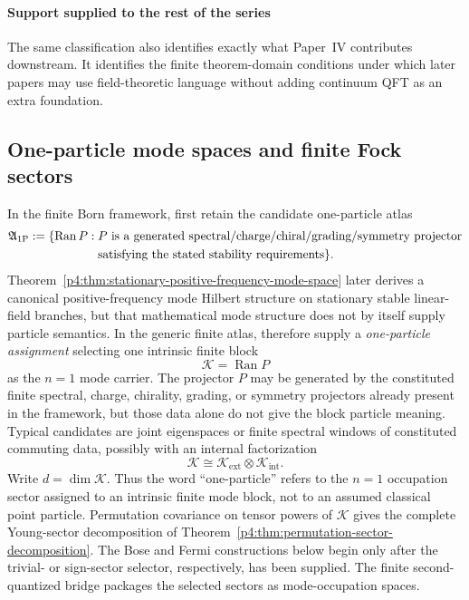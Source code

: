 \documentclass[12pt,a4paper]{article}
\begin{document}
\paragraph{Support supplied to the rest of the series}
\label{p4:sec:qft-support-map}

The same classification also identifies exactly what Paper~IV contributes downstream.  It identifies the finite theorem-domain conditions under which later papers may use field-theoretic language without adding continuum QFT as an extra foundation.




\subsection{One-particle mode spaces and finite Fock sectors}
\label{p4:sec:part2-fock}

In the finite Born framework, first retain the candidate one-particle atlas
\[
\begin{aligned}
 \mathfrak A_{\rm 1P}:=\{\operatorname{Ran}P:\;&P\text{ is a generated
 spectral/charge/chiral/grading/symmetry projector}\\
 &\text{satisfying the stated stability requirements}\}.
\end{aligned}
\]
Theorem~\ref{p4:thm:stationary-positive-frequency-mode-space} later derives
a canonical positive-frequency mode Hilbert structure on stationary stable
linear-field branches, but that mathematical mode structure does not by itself
supply particle semantics.  In the generic finite atlas, therefore supply a
\emph{one-particle assignment} selecting one intrinsic finite block
\[
  \mathcal K=\operatorname{Ran}P
\]
as the \(n=1\) mode carrier.  The projector \(P\) may be generated by the
constituted finite spectral, charge, chirality, grading, or symmetry
projectors already present in the framework, but those data alone do not
give the block particle meaning.  Typical candidates are joint eigenspaces
or finite spectral windows of constituted commuting data, possibly with an internal factorization
\[
\mathcal K\cong \mathcal K_{\mathrm{ext}}\otimes \mathcal K_{\mathrm{int}}.
\]
Write \(d=\dim \mathcal K\).  Thus the word ``one-particle'' refers to the
\(n=1\) occupation sector assigned to an intrinsic finite mode block, not to
an assumed classical point particle.  Permutation covariance on tensor powers
of \(\mathcal K\) gives the complete Young-sector decomposition of
Theorem~\ref{p4:thm:permutation-sector-decomposition}.  The Bose and Fermi
constructions below begin only after the trivial- or sign-sector selector,
respectively, has been supplied.  The finite second-quantized bridge packages
the selected sectors as mode-occupation spaces.
\end{document}
